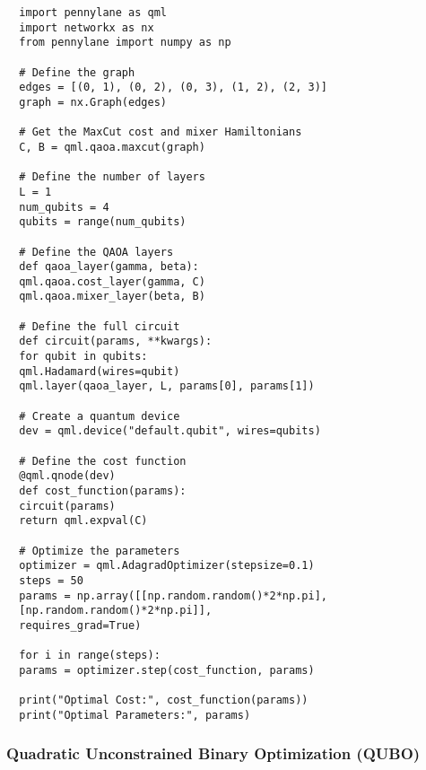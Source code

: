 \begin{verbatim}
  import pennylane as qml
  import networkx as nx
  from pennylane import numpy as np

  # Define the graph
  edges = [(0, 1), (0, 2), (0, 3), (1, 2), (2, 3)]
  graph = nx.Graph(edges)

  # Get the MaxCut cost and mixer Hamiltonians
  C, B = qml.qaoa.maxcut(graph)

  # Define the number of layers
  L = 1
  num_qubits = 4
  qubits = range(num_qubits)

  # Define the QAOA layers
  def qaoa_layer(gamma, beta):
  qml.qaoa.cost_layer(gamma, C)
  qml.qaoa.mixer_layer(beta, B)

  # Define the full circuit
  def circuit(params, **kwargs):
  for qubit in qubits:
  qml.Hadamard(wires=qubit)
  qml.layer(qaoa_layer, L, params[0], params[1])

  # Create a quantum device
  dev = qml.device("default.qubit", wires=qubits)

  # Define the cost function
  @qml.qnode(dev)
  def cost_function(params):
  circuit(params)
  return qml.expval(C)

  # Optimize the parameters
  optimizer = qml.AdagradOptimizer(stepsize=0.1)
  steps = 50
  params = np.array([[np.random.random()*2*np.pi],
  [np.random.random()*2*np.pi]],
  requires_grad=True)

  for i in range(steps):
  params = optimizer.step(cost_function, params)

  print("Optimal Cost:", cost_function(params))
  print("Optimal Parameters:", params)
\end{verbatim}



\vspace{0.3cm}

\subsubsection*{Quadratic Unconstrained Binary Optimization (QUBO)}


